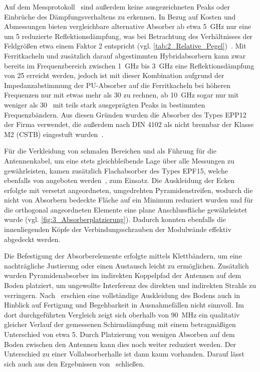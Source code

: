 Auf dem Messprotokoll~\cite{Eco_Messtechnik_Absorber} sind außerdem keine ausgezeichneten Peaks oder Einbrüche des Dämpfungsverhaltens zu erkennen. In Bezug auf Kosten und Abmessungen bieten vergleichbare alternative Absorber ab etwa \SI{5}{\giga\hertz} nur eine um \SI{5}{\Dezibel} reduzierte Reflektionsdämpfung, was bei Betrachtung des Verhältnisses der Feldgrößen etwa einem Faktor 2 entspricht (vgl. \Tabelle\ref{tab:2_Relative_Pegel})~\cite{Holland_Shielding_Absorber}. Mit Ferritkacheln und zusätzlich darauf abgestimmten Hybridabsorbern kann zwar bereits im Frequenzbereich zwischen \SI{1}{\giga\hertz} bis \SI{3}{\giga\hertz} eine Reflektionsdämpfung von \SI{25}{\Dezibel} erreicht werden, jedoch ist mit dieser Kombination aufgrund der Impedanzabstimmung der PU-Absorber auf die Ferritkacheln bei höheren Frequenzen nur mit etwas mehr als \SI{30}{\Dezibel} zu rechnen, ab \SI{10}{\giga\hertz} sogar nur mit weniger als \SI{30}{\Dezibel}~\cite{Holland_Shielding_Absorber} mit teils stark ausgeprägten Peaks in bestimmten Frequenzbändern. Aus diesen Gründen wurden die Absorber des Types EPP12 der Firma  verwendet, die außerdem nach DIN 4102 als nicht brennbar der Klasse M2 (CSTB) eingestuft wurden~\cite{Eco_Messtechnik_Absorber}. 
\par
\vspace{\linespace}
Für die Verkleidung von schmalen Bereichen und als Führung für die Antennenkabel, um eine stets gleichbleibende Lage über alle Messungen zu gewährleisten, kamen zusätzlich Flachabsorber des Types EPF15, welche ebenfalls von  angeboten werden~\cite{Eco_Messtechnik_Absorber}, zum Einsatz. Die Auskleidung der Ecken erfolgte mit versetzt angeordneten, umgedrehten Pyramidenstreifen, wodurch die nicht von Absorbern bedeckte Fläche auf ein Minimum reduziert wurden und für die orthogonal angeordneten Elemente eine plane Anschlussfläche gewährleistet wurde (vgl. \Abb\ref{fig:3_Absorberplatzierung}). Dadurch konnten ebenfalls die innenliegenden Köpfe der Verbindungsschrauben der Modulwände effektiv abgedeckt werden. 
\par
\vspace{\linespace}
Die Befestigung der Absorberelemente erfolgte mittels Klettbändern, um eine nachträgliche Justierung oder einen Austausch leicht zu ermöglichen. Zusätzlich wurden Pyramidenabsorber im indirekten Koppelpfad der Antennen auf dem Boden platziert, um ungewollte Interferenz des direkten und indirekten Strahls zu verringern. Nach~\cite{Vergleich_Absorberhalle_Groundplane} erschien eine vollständige Auskleidung des Bodens auch in Hinblick auf Fertigung und Begehbarkeit in Ausnahmefällen nicht sinnvoll. Im dort durchgeführten Vergleich zeigt sich oberhalb von \SI{90}{\mega\hertz} ein qualitativ gleicher Verlauf der gemessenen Schirmdämpfung mit einem betragmäßigen Unterschied von etwa \SI{5}{\Dezibel}. Durch Platzierung von wenigen Absorben auf dem Boden zwischen den Antennen kann dies noch weiter reduziert werden. Der Unterschied zu einer Vollabsorberhalle ist dann kaum vorhanden. Darauf lässt sich auch aus den Ergebnissen von~\cite{Optimierung_Feldhomogenitaet} schließen.
\par
\vspace{\linespace}

